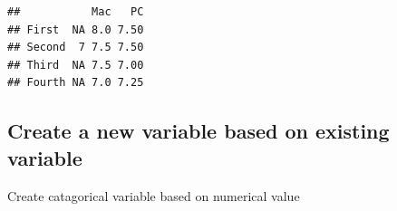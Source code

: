 \documentclass[
  openany]{book}
\newenvironment{Shaded}{\begin{snugshade}}{\end{snugshade}}
\newcommand{\AttributeTok}[1]{\textcolor[rgb]{0.13,0.29,0.53}{#1}}
\newcommand{\ConstantTok}[1]{\textcolor[rgb]{0.56,0.35,0.01}{#1}}
\newcommand{\DecValTok}[1]{\textcolor[rgb]{0.00,0.00,0.81}{#1}}
\newcommand{\FunctionTok}[1]{\textcolor[rgb]{0.13,0.29,0.53}{\textbf{#1}}}
\newcommand{\NormalTok}[1]{#1}
\newcommand{\OtherTok}[1]{\textcolor[rgb]{0.56,0.35,0.01}{#1}}
\newcommand{\SpecialCharTok}[1]{\textcolor[rgb]{0.81,0.36,0.00}{\textbf{#1}}}
\newcommand{\StringTok}[1]{\textcolor[rgb]{0.31,0.60,0.02}{#1}}
\begin{document}
\begin{Shaded}
\end{Shaded}

\begin{verbatim}
##           Mac   PC
## First  NA 8.0 7.50
## Second  7 7.5 7.50
## Third  NA 7.5 7.00
## Fourth NA 7.0 7.25
\end{verbatim}

\subsection{\texorpdfstring{\textbf{Create a new variable based on existing variable}}{Create a new variable based on existing variable}}\label{create-a-new-variable-based-on-existing-variable}

\begin{Shaded}
\end{Shaded}

Create catagorical variable based on numerical value

\begin{Shaded}
\end{Shaded}
\end{document}
